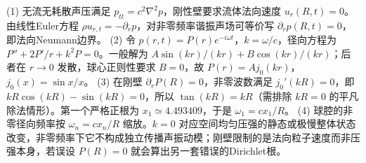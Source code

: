 (1) 无流无耗散声压满足 \(p_{tt}=c^2\nabla^2p\)，刚性壁要求流体法向速度 \(u_r(R,t)=0\)。由线性Euler方程 \(\rho u_{r,t}=-\partial_rp\)，对非零频率谐振声场可等价写 \(\partial_rp(R,t)=0\)，即法向Neumann边界。
(2) 令 \(p(r,t)=P(r)e^{-i\omega t}\)，\(k=\omega/c\)，径向方程为 \(P''+2P'/r+k^2P=0\)。一般解为 \(A\sin(kr)/(kr)+B\cos(kr)/(kr)\)；后者在 \(r\to0\) 发散，球心正则性要求 \(B=0\)，故 \(P(r)=A j_0(kr)\)，\(j_0(x)=\sin x/x\)。
(3) 在刚壁 \(\partial_rP(R)=0\)，非零波数满足 \(j_0'(kR)=0\)，即 \(kR\cos(kR)-\sin(kR)=0\)，所以 \(\tan(kR)=kR\)（需排除 \(kR=0\) 的平凡除法情形）。第一个严格正根为 \(x_1\simeq4.493409\)，于是 \(\omega_1=cx_1/R\)。
(4) 球腔的非零径向频率按 \(\omega_n=c x_n/R\) 缩放。\(k=0\) 对应空间均匀压强的静态或极慢整体状态改变，非零频率下它不构成独立传播声振动模；刚壁限制的是法向粒子速度而非压强本身，若误设 \(P(R)=0\) 就会算出另一套错误的Dirichlet根。
